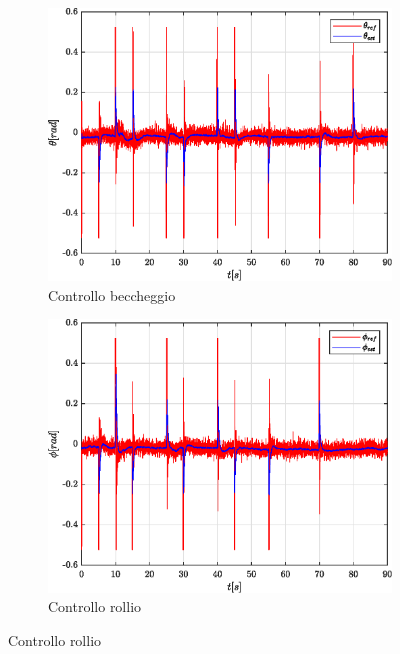 \begin{figure}
	\centering
	\begin{subfigure}{0.45\textwidth}
		\centering
		\includegraphics[width=1\textwidth]{Simulazioni/Figure/PID/SNAKE/AttitudeControlPitch}
		\caption{Controllo beccheggio}
		\label{fig:SNAKEerrbecPID}
	\end{subfigure}
	\hfill
	\begin{subfigure}{0.45\textwidth}
		\centering
		\includegraphics[width=1\textwidth]{Simulazioni/Figure/PID/SNAKE/AttitudeControlRoll}
		\caption{Controllo rollio}
		\label{fig:SNAKEerrrolPID}
	\end{subfigure}

\end{figure}
